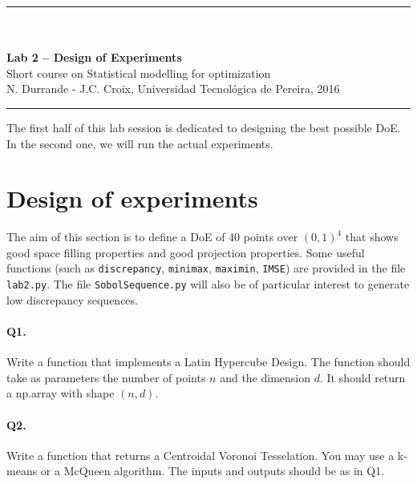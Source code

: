\documentclass[12pt]{scrartcl}
\begin{document}
\begin{center}
	\rule{\textwidth}{1pt}
	\\ \ \\
	{\LARGE \textbf{Lab 2 -- Design of Experiments}}\\ 
	\vspace{3mm}
	{\large Short course on Statistical modelling for optimization\\ \vspace{3mm}}
	{\normalsize N. Durrande - J.C. Croix, Universidad Tecnol\'ogica de Pereira, 2016}\\ 
	\vspace{3mm}
	\rule{\textwidth}{1pt}
	\vspace{5mm}
\end{center}
The first half of this lab session is dedicated to designing the best possible DoE. In the second one, we will run the actual experiments. 

\section{Design of experiments}
The aim of this section is to define a DoE of 40 points over $(0,1)^4$ that shows good space filling properties and good projection properties. Some useful functions (such as \texttt{discrepancy}, \texttt{minimax}, \texttt{maximin}, \texttt{IMSE}) are provided in the file \texttt{lab2.py}. The file \texttt{SobolSequence.py} will also be of particular interest to generate low discrepancy sequences. 

\paragraph{Q1.} Write a function that implements a Latin Hypercube Design. The function should take as parameters the number of points $n$ and the dimension $d$. It should return a np.array with shape $(n,d)$.

\paragraph{Q2.} Write a function that returns a Centroidal Voronoi Tesselation. You may use a k-means or a McQueen algorithm. The inputs and outputs should be as in Q1.
\end{document}
